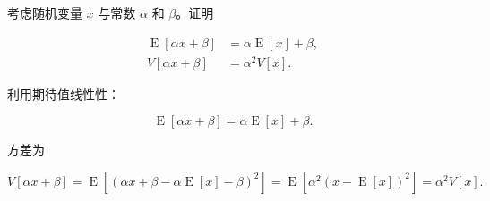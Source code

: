 \begin{question}
考虑随机变量 \(x\) 与常数 \(\alpha\) 和 \(\beta\)。证明

\[
\begin{split}
\operatorname{E}[\alpha x+\beta]&=\alpha \operatorname{E}[x]+\beta,\\
V[\alpha x+\beta]&=\alpha^2 V[x].
\end{split}
\]
\begin{solution}
利用期待值线性性：

\[
\operatorname{E}[\alpha x+\beta]=\alpha \operatorname{E}[x]+\beta.
\]

方差为

\[
V[\alpha x+\beta]=\operatorname{E}[(\alpha x+\beta-\alpha \operatorname{E}[x]-\beta)^2]
=\operatorname{E}[\alpha^2(x-\operatorname{E}[x])^2]=\alpha^2V[x].
\]
\end{solution}
\end{question}


